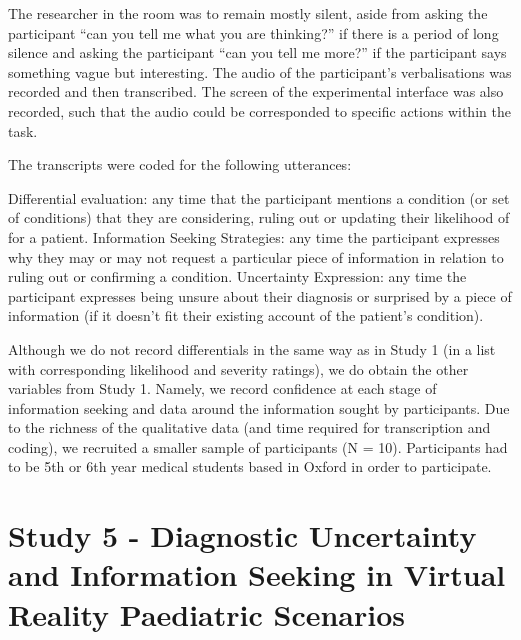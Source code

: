 \documentclass[a4paper, nobind]{templates/ociamthesis}
\begin{document}
The researcher in the room was to remain mostly silent, aside from asking the participant ``can you tell me what you are thinking?'' if there is a period of long silence and asking the participant ``can you tell me more?'' if the participant says something vague but interesting. The audio of the participant's verbalisations was recorded and then transcribed. The screen of the experimental interface was also recorded, such that the audio could be corresponded to specific actions within the task.

The transcripts were coded for the following utterances:

Differential evaluation: any time that the participant mentions a condition (or set of conditions) that they are considering, ruling out or updating their likelihood of for a patient.
Information Seeking Strategies: any time the participant expresses why they may or may not request a particular piece of information in relation to ruling out or confirming a condition.
Uncertainty Expression: any time the participant expresses being unsure about their diagnosis or surprised by a piece of information (if it doesn't fit their existing account of the patient's condition).

Although we do not record differentials in the same way as in Study 1 (in a list with corresponding likelihood and severity ratings), we do obtain the other variables from Study 1. Namely, we record confidence at each stage of information seeking and data around the information sought by participants. Due to the richness of the qualitative data (and time required for transcription and coding), we recruited a smaller sample of participants (N = 10). Participants had to be 5th or 6th year medical students based in Oxford in order to participate.

\hypertarget{study-5---diagnostic-uncertainty-and-information-seeking-in-virtual-reality-paediatric-scenarios}{%
\chapter*{Study 5 - Diagnostic Uncertainty and Information Seeking in Virtual Reality Paediatric Scenarios}\label{study-5---diagnostic-uncertainty-and-information-seeking-in-virtual-reality-paediatric-scenarios}}

\adjustmtc
{}
\end{document}
